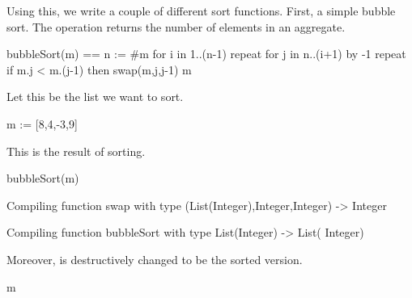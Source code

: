 \begin{xtc}
\begin{xtccomment}
Using this, we write a couple of different sort functions.
First, a simple bubble sort.
The operation  returns the number of elements in
an aggregate.
\end{xtccomment}
\begin{spadsrc}
bubbleSort(m) ==
  n := #m
  for i in 1..(n-1) repeat
    for j in n..(i+1) by -1 repeat
      if m.j < m.(j-1) then swap(m,j,j-1)
  m
\end{spadsrc}
\end{xtc}
\begin{xtc}
\begin{xtccomment}
Let this be the list we want to sort.
\end{xtccomment}
\begin{spadsrc}
m := [8,4,-3,9] 
\end{spadsrc}
\begin{TeXOutput}
\begin{fricasmath}{6}
%
\end{fricasmath}
\end{TeXOutput}
\end{xtc}
\begin{xtc}
\begin{xtccomment}
This is the result of sorting.
\end{xtccomment}
\begin{spadsrc}
bubbleSort(m) 
\end{spadsrc}
\begin{MessageOutput}
   Compiling function swap with type (List(Integer),Integer,Integer)
       -> Integer 
\end{MessageOutput}
\begin{MessageOutput}
   Compiling function bubbleSort with type List(Integer) -> List(
      Integer) 
\end{MessageOutput}
\begin{TeXOutput}
\begin{fricasmath}{7}
%
\end{fricasmath}
\end{TeXOutput}
\end{xtc}
\begin{xtc}
\begin{xtccomment}
Moreover,  is destructively changed to be the sorted version.
\end{xtccomment}
\begin{spadsrc}
m 
\end{spadsrc}
\begin{TeXOutput}
\begin{fricasmath}{8}
%
\end{fricasmath}
\end{TeXOutput}
\end{xtc}


